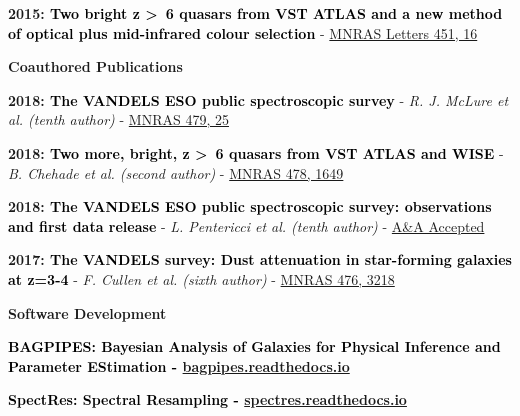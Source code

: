 \documentclass[a4paper,11pt,final]{memoir}
\newcommand{\Sep}{\vspace{1.5em}}
\newcommand{\SmallSep}{\vspace{0.5em}}
\newcommand{\CVSection}[1]
	{\Large\textbf{#1}\par
	\SmallSep\normalsize\normalfont}
\newcommand{\CVItem}[1]
	{\textbf{\color{RoyalBlue} #1}}
\begin{document}
\textbf{\color{RoyalBlue}2015: \textcolor{black}{Two bright z \textgreater\ 6 quasars from VST ATLAS and a new method of optical plus mid-infrared colour selection}} - {\color{RoyalBlue}\href{https://academic.oup.com/mnrasl/article-abstract/451/1/L16/954689?redirectedFrom=PDF}{MNRAS Letters 451, 16}}

\Sep

\CVSection{Coauthored Publications}

\textbf{\color{RoyalBlue}2018: \textcolor{black}{The VANDELS ESO public spectroscopic survey}} - \textit{R. J. McLure et al. (tenth author)} - {\color{RoyalBlue}\href{https://academic.oup.com/mnras/article-abstract/479/1/25/4995916}{MNRAS 479, 25}}

\SmallSep

\textbf{\color{RoyalBlue}2018: \textcolor{black}{Two more, bright, z \textgreater\ 6 quasars from VST ATLAS and WISE}} - \textit{B. Chehade et al. (second author)} - {\color{RoyalBlue}\href{https://academic.oup.com/mnras/article-abstract/478/2/1649/4944228}{MNRAS 478, 1649}}

\SmallSep

\textbf{\color{RoyalBlue}2018: \textcolor{black}{The VANDELS ESO public spectroscopic survey: observations and first data release}} - \textit{L. Pentericci et al. (tenth author)} - {\color{RoyalBlue}\href{https://www.aanda.org/component/article?access=doi&doi=10.1051/0004-6361/201833047}{A\&A Accepted}}

\SmallSep

\textbf{\color{RoyalBlue}2017: \textcolor{black}{The VANDELS survey: Dust attenuation in star-forming galaxies at z=3-4}} - \textit{F. Cullen et al. (sixth author)} - {\color{RoyalBlue}\href{https://academic.oup.com/mnras/article-abstract/476/3/3218/4898075}{MNRAS 476, 3218}}\\

\clearpage
\framebreak
\framebreak

\CVSection{Software Development}

\CVItem{\textcolor{black}{BAGPIPES: Bayesian Analysis of Galaxies for Physical Inference and Parameter EStimation -} {\color{RoyalBlue}\href{https://bagpipes.readthedocs.io}{bagpipes.readthedocs.io}}}

 \SmallSep

\CVItem{\textcolor{black}{SpectRes: Spectral Resampling -} {\color{RoyalBlue}\href{https://spectres.readthedocs.io}{spectres.readthedocs.io}}}

\Sep
\end{document}
